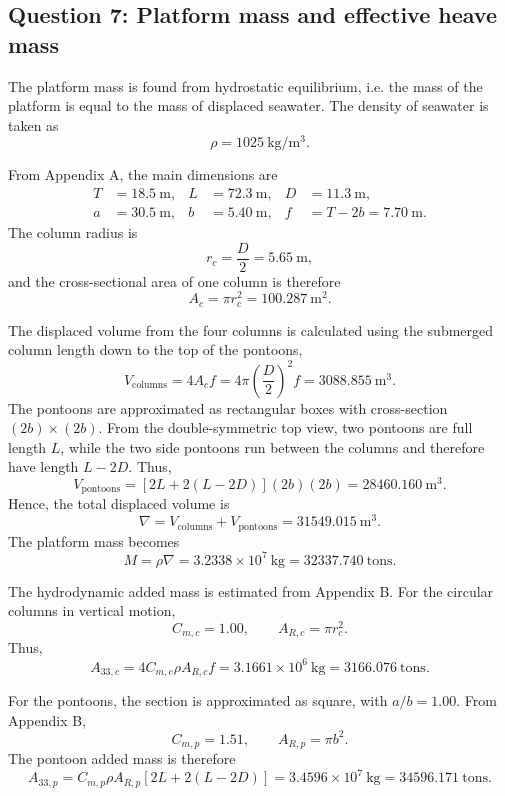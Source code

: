 \subsection*{Question 7: Platform mass and effective heave mass}

The platform mass is found from hydrostatic equilibrium, i.e. the mass of the
platform is equal to the mass of displaced seawater. The density of seawater is
taken as
\[
    \rho = 1025~\mathrm{kg/m^3}.
\]

From Appendix A, the main dimensions are
\[
\begin{aligned}
    T &= 18.5~\mathrm{m}, &
    L &= 72.3~\mathrm{m}, &
    D &= 11.3~\mathrm{m},\\
    a &= 30.5~\mathrm{m}, &
    b &= 5.40~\mathrm{m}, &
    f &= T - 2b = 7.70~\mathrm{m}.
\end{aligned}
\]
The column radius is
\[
    r_c = \frac{D}{2} = 5.65~\mathrm{m},
\]
and the cross-sectional area of one column is therefore
\[
    A_c = \pi r_c^2 = 100.287~\mathrm{m^2}.
\]

The displaced volume from the four columns is calculated using the submerged
column length down to the top of the pontoons,
\[
    V_{\mathrm{columns}} = 4 A_c f
    = 4 \pi \left(\frac{D}{2}\right)^2 f
    = 3088.855~\mathrm{m^3}.
\]
The pontoons are approximated as rectangular boxes with cross-section
\((2b)\times(2b)\). From the double-symmetric top view, two pontoons are
full length \(L\), while the two side pontoons run between the columns and
therefore have length \(L-2D\). Thus,
\[
    V_{\mathrm{pontoons}}
    = \left[2L + 2(L-2D)\right](2b)(2b)
    = 28460.160~\mathrm{m^3}.
\]
Hence, the total displaced volume is
\[
    \nabla
    = V_{\mathrm{columns}} + V_{\mathrm{pontoons}}
    = 31549.015~\mathrm{m^3}.
\]
The platform mass becomes
\[
    M = \rho \nabla
    = 3.2338 \times 10^7~\mathrm{kg}
    = 32337.740~\mathrm{tons}.
\]

The hydrodynamic added mass is estimated from Appendix B. For the circular
columns in vertical motion,
\[
    C_{m,c} = 1.00,
    \qquad
    A_{R,c} = \pi r_c^2.
\]
Thus,
\[
    A_{33,c}
    = 4 C_{m,c} \rho A_{R,c} f
    = 3.1661 \times 10^6~\mathrm{kg}
    = 3166.076~\mathrm{tons}.
\]

For the pontoons, the section is approximated as square, with \(a/b = 1.00\).
From Appendix B,
\[
    C_{m,p} = 1.51,
    \qquad
    A_{R,p} = \pi b^2.
\]
The pontoon added mass is therefore
\[
    A_{33,p}
    = C_{m,p} \rho A_{R,p}\left[2L + 2(L-2D)\right]
    = 3.4596 \times 10^7~\mathrm{kg}
    = 34596.171~\mathrm{tons}.
\]

